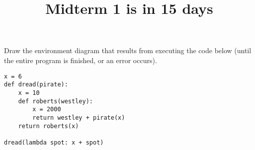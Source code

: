\documentclass[twoside]{article}
\title{\sc Midterm 1 is in 15 days}
\begin{document}
\maketitle

\begin{enumerate}

Draw the environment diagram that results from executing the code below (until the entire program is finished, or an error occurs).
\vspace{0.1in}

\begin{lstlisting}
x = 6
def dread(pirate):
    x = 10
    def roberts(westley):
        x = 2000
        return westley + pirate(x)
    return roberts(x)

dread(lambda spot: x + spot)
\end{lstlisting}

\end{enumerate}
\end{document}
